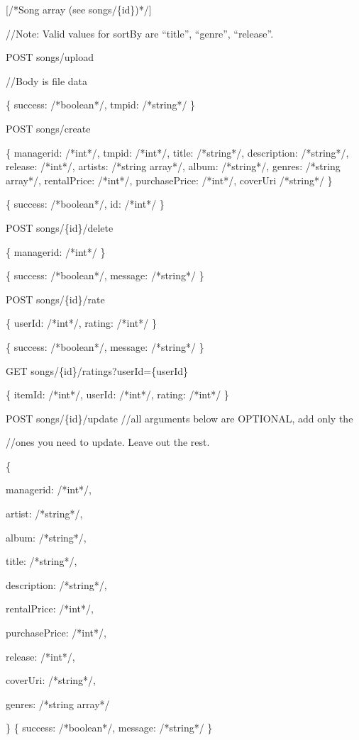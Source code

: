     [/*Song array (see songs/\{id\})*/]

    //Note: Valid values for sortBy are “title”, “genre”, “release”.

POST songs/upload

    //Body is file data

    \{ success: /*boolean*/, tmpid: /*string*/ \}

POST songs/create

    \{ managerid: /*int*/, tmpid: /*int*/, title: /*string*/, description: /*string*/, release: /*int*/, artists: /*string array*/, album: /*string*/, genres: /*string array*/, rentalPrice: /*int*/, purchasePrice: /*int*/, coverUri /*string*/ \}

    \{ success: /*boolean*/, id: /*int*/ \}

POST songs/\{id\}/delete

      \{ managerid: /*int*/ \}

      \{ success: /*boolean*/, message: /*string*/ \}

POST songs/\{id\}/rate   

    \{ userId: /*int*/, rating: /*int*/ \}

    \{ success: /*boolean*/, message: /*string*/ \}

GET songs/\{id\}/ratings?userId=\{userId\}

    \{ itemId: /*int*/, userId: /*int*/, rating: /*int*/ \}

POST songs/\{id\}/update //all arguments below are OPTIONAL, add only the

                      //ones you need to update. Leave out the rest.

    \{

         managerid: /*int*/,

         artist: /*string*/,

         album: /*string*/,

         title: /*string*/,

         description: /*string*/,

         rentalPrice: /*int*/,

         purchasePrice: /*int*/,

         release: /*int*/,

         coverUri: /*string*/,

         genres: /*string array*/

    \}
    \{ success: /*boolean*/, message: /*string*/ \}